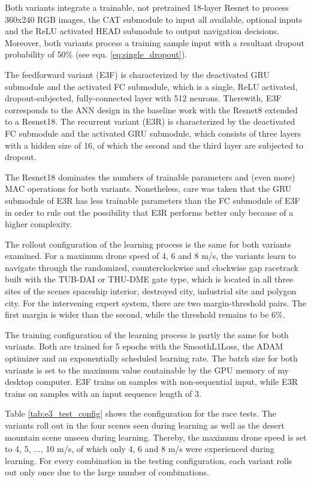 Both variants integrate a trainable,
not pretrained 18-layer Resnet
to process 360x240 RGB images,
the CAT submodule to input 
all available, optional inputs
and the ReLU activated HEAD submodule 
to output navigation decisions.
Moreover, both variants process a training sample 
input with a resultant dropout probability of 
50\% (see equ. \ref{eq:single_dropout}).

The feedforward variant (E3F)
is characterized by the deactivated GRU submodule
and the activated FC submodule,
which is a single, ReLU activated,
dropout-subjected, fully-connected layer with 512 neurons.
Therewith, 
E3F corresponds to the ANN design in the baseline work
with the Resnet8 extended to a Resnet18.
The recurrent variant (E3R)
is characterized by the deactivated FC submodule
and the activated GRU submodule,
which consists of three layers with a hidden size of 16, of
which the second and the third layer are subjected to dropout.

The Resnet18 dominates the numbers of trainable parameters
and (even more) MAC operations for both variants.
Nonetheless, care was taken that the
GRU submodule of E3R
has less trainable parameters
than the FC submodule of E3F
in order to rule out
the possibility that E3R performs 
better only because of a higher complexity.

The rollout configuration of the learning process 
is the same for both variants examined.
For a maximum drone speed of 
4, 6 and 8 m/s,
the variants learn to navigate 
through the randomized, counterclockwise 
and clockwise gap racetrack 
built with the TUB-DAI or THU-DME gate type,
which is located in all three sites of the scenes
spaceship interior, destroyed city,
industrial site and polygon city.
For the intervening expert system,
there are two margin-threshold pairs.
The first margin is wider than the second,
while the threshold remains to be 6\%.


The training configuration of the learning process 
is partly the same for both variants.
Both are trained for 5 epochs 
with the SmoothL1Loss, the ADAM optimizer
and an exponentially scheduled learning rate.
The batch size for both variants 
is set to the maximum value containable by the GPU
memory of my desktop computer.
E3F trains on samples with non-sequential input,
while E3R trains on samples with an input sequence length
of 3.

Table \ref{tab:e3_test_config} shows the configuration for the race tests.
The variants roll out in the four scenes seen during learning
as well as the desert mountain scene unseen during learning.
Thereby, the maximum drone speed is set to 
4, 5, ..., 10 m/s, of which only 4, 6 and 8 m/s
were experienced during learning.
For every combination in the testing configuration,
each variant rolls out only once
due to the large number of combinations.


